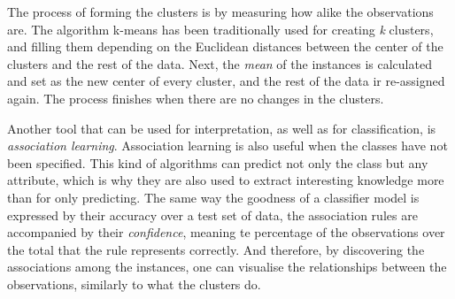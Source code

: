 The process of forming the clusters is by measuring how alike the observations are. The algorithm k-means \cite{hartigan1975clustering} has been traditionally used for creating \textit{k} clusters, and filling them depending on the Euclidean distances between the center of the clusters and the rest of the data. Next, the \textit{mean} of the instances is calculated and set as the new center of every cluster, and the rest of the data ir re-assigned again. The process finishes when there are no changes in the clusters.

Another tool that can be used for interpretation, as well as for classification, is \textit{association learning}. Association learning is also useful when the classes have not been specified. This kind of algorithms \cite{hipp2000algorithms} can predict not only the class but any attribute, which is why they are also used to extract interesting knowledge more than for only predicting. The same way the goodness of a classifier model is expressed by their accuracy over a test set of data, the association rules are accompanied by their \textit{confidence}, meaning te percentage of the observations over the total that the rule represents correctly. And therefore, by discovering the associations among the instances, one can visualise the relationships between the observations, similarly to what the clusters do.